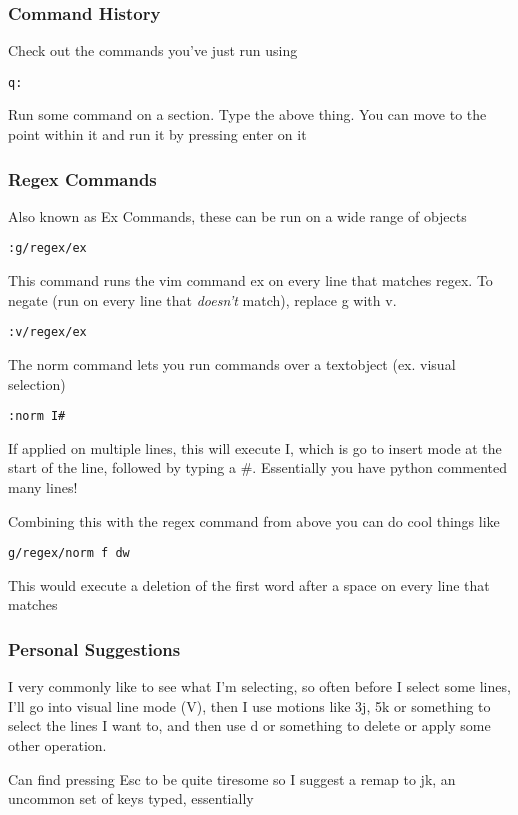 \documentclass[12pt, letterpaper]{article}
\begin{document}
\subsubsection{Command History}
Check out the commands you've just run using
\begin{verbatim}
q:
\end{verbatim}
Run some command on a section. Type the above thing. You can move to the point
within it and run it by pressing enter on it


\subsubsection{Regex Commands}
Also known as Ex Commands, these can be run on a wide range of objects
\begin{verbatim}
:g/regex/ex
\end{verbatim}
This command runs the vim command ex on every line that matches regex.
To negate (run on every line that \textit{doesn't} match), replace g with v.
\begin{verbatim}
:v/regex/ex
\end{verbatim}

The norm command lets you run commands over a textobject (ex. visual selection)
\begin{verbatim}
:norm I#
\end{verbatim}
If applied on multiple lines, this will execute I, which is go to insert mode
at the start of the line, followed by typing a \#. Essentially you have python
commented many lines!


Combining this with the regex command from above you can do cool things like
\begin{verbatim}
g/regex/norm f dw 
\end{verbatim}
This would execute a deletion of the first word after a space on every line that matches


\subsubsection{Personal Suggestions}
I very commonly like to see what I'm selecting, so often before I select some
lines, I'll go into visual line mode (V), then I use motions like 3j, 5k or
something to select the lines I want to, and then use d or something to delete
or apply some other operation.


Can find pressing Esc to be quite tiresome so I suggest a remap to jk, an
uncommon set of keys typed, essentially 
\end{document}
